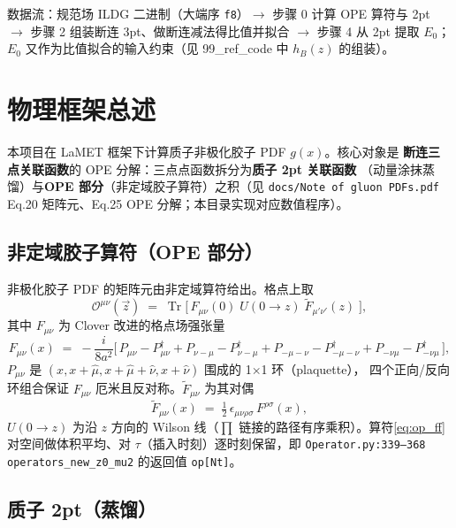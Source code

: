 \documentclass[UTF8,11pt]{ctexart}
\begin{document}
数据流：规范场 ILDG 二进制（大端序 \texttt{f8}）$\to$ 步骤 0 计算 OPE 算符与 2pt $\to$
步骤 2 组装断连 3pt、做断连减法得比值并拟合 $\to$ 步骤 4 从 2pt 提取 $E_0$；
$E_0$ 又作为比值拟合的输入约束（见 99\_ref\_code 中 $h_B(z)$ 的组装）。

\section{物理框架总述}
\label{sec:framework}

本项目在 LaMET 框架下计算质子非极化胶子 PDF $g(x)$。核心对象是
\textbf{断连三点关联函数}的 OPE 分解：三点点函数拆分为\textbf{质子 2pt 关联函数}
（动量涂抹蒸馏）与\textbf{OPE 部分}（非定域胶子算符）之积（见 \texttt{docs/Note of gluon PDFs.pdf}
Eq.20 矩阵元、Eq.25 OPE 分解；本目录实现对应数值程序）。

\subsection{非定域胶子算符（OPE 部分）}
\label{sec:ope_def}

非极化胶子 PDF 的矩阵元由非定域算符给出。格点上取
\begin{equation}
  \label{eq:op_ff}
  \mathcal{O}^{\mu\nu}(\vec{z})
  \;=\; \operatorname{Tr}\Big[\, F_{\mu\nu}(0)\; U(0\to z)\;\tilde{F}_{\mu'\nu'}(z)\;\Big],
\end{equation}
其中 $F_{\mu\nu}$ 为 Clover 改进的格点场强张量
\begin{equation}
  \label{eq:clover}
  F_{\mu\nu}(x) \;=\; -\frac{i}{8a^2}\Big[\,P_{\mu\nu}-P_{\mu\nu}^\dagger +
  P_{\nu-\mu}-P_{\nu-\mu}^\dagger + P_{-\mu-\nu}-P_{-\mu-\nu}^\dagger +
  P_{-\nu\mu}-P_{-\nu\mu}^\dagger\,\Big],
\end{equation}
$P_{\mu\nu}$ 是 $(x, x+\hat\mu, x+\hat\mu+\hat\nu, x+\hat\nu)$ 围成的 1$\times$1 环（plaquette），
四个正向/反向环组合保证 $F_{\mu\nu}$ 厄米且反对称。$\tilde{F}_{\mu\nu}$ 为其对偶
\begin{equation}
  \label{eq:dual}
  \tilde{F}_{\mu\nu}(x)\;=\;\tfrac{1}{2}\,\epsilon_{\mu\nu\rho\sigma}\,F^{\rho\sigma}(x),
\end{equation}
$U(0\to z)$ 为沿 $z$ 方向的 Wilson 线（$\prod$ 链接的路径有序乘积）。算符\eqref{eq:op_ff}
对空间做体积平均、对 $\tau$（插入时刻）逐时刻保留，即
\texttt{Operator.py:339--368} \texttt{operators\_new\_z0\_mu2} 的返回值 \texttt{op[Nt]}。

\subsection{质子 2pt（蒸馏）}
\label{sec:2pt_def}
\end{document}

